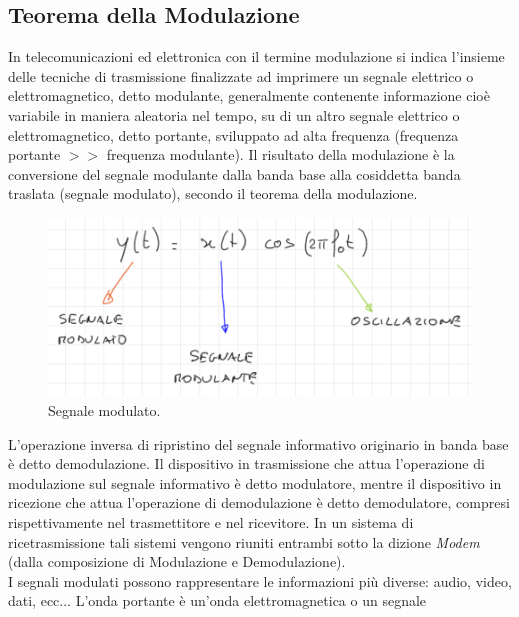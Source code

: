 \documentclass[12pt,oneside,openany]{memoir}
\numberwithin{equation}{subsection}
\begin{document}

\newpage
\subsection{Teorema della Modulazione}
In telecomunicazioni ed elettronica con il termine modulazione si indica
l'insieme delle tecniche di trasmissione finalizzate ad imprimere un segnale
elettrico o elettromagnetico, detto modulante, generalmente contenente
informazione cio\`e variabile in maniera aleatoria nel tempo, su di un altro
segnale elettrico o elettromagnetico, detto portante, sviluppato ad alta
frequenza (frequenza portante $>>$ frequenza modulante). Il risultato della
modulazione \`e la conversione del segnale modulante dalla banda base alla
cosiddetta banda traslata (segnale modulato), secondo il teorema della
modulazione.
\begin{figure}[H]
	\centering
	\captionsetup{justification=centering}
	\includegraphics[width=1.0\textwidth]{images/modulato_modulante_oscillazione.png}
	\caption{Segnale modulato.}
\end{figure}
L'operazione inversa di ripristino del segnale informativo originario in banda
base \`e detto demodulazione. Il dispositivo in trasmissione che attua
l'operazione di modulazione sul segnale informativo \`e detto modulatore, mentre
il dispositivo in ricezione che attua l'operazione di demodulazione \`e detto
demodulatore, compresi rispettivamente nel trasmettitore e nel ricevitore. In
un sistema di ricetrasmissione tali sistemi vengono riuniti entrambi sotto la
dizione \textit{Modem} (dalla composizione di Modulazione e Demodulazione).\\
I segnali modulati possono rappresentare le informazioni pi\`u diverse: audio,
video, dati, ecc... L'onda portante \`e un'onda elettromagnetica o un segnale
\end{document}
